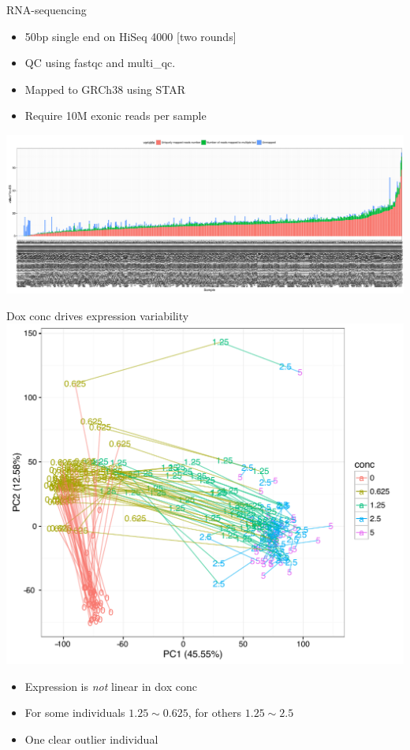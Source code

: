 \documentclass{beamer}
\begin{document}
\begin{frame}{RNA-sequencing}
\begin{itemize}
\item 50bp single end on HiSeq 4000 [two rounds]
\item QC using fastqc and multi\_qc. 
\item Mapped to GRCh38 using STAR
\item Require 10M exonic reads per sample
\end{itemize}
\centering
\includegraphics[width=1\textwidth,clip,trim=0 0 0 0]{../figures/mapped.pdf}
\end{frame}

\begin{frame}{Dox conc drives expression variability}
\centering
\includegraphics[width=.6\textwidth,clip,trim=0 0 0 0]{../figures/pca.pdf}
\begin{itemize}
\item Expression is \emph{not} linear in dox conc
\item For some individuals $1.25 \sim 0.625$, for others $1.25 \sim 2.5$
\item One clear outlier individual
\end{itemize}
\end{frame}
\end{document}
